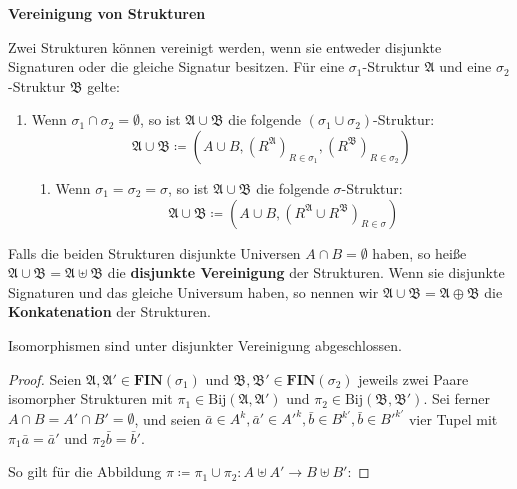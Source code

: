 %
\begin{defn}
\textbf{\label{def:disjoint-union}Vereinigung von Strukturen}

Zwei Strukturen können vereinigt werden, wenn sie entweder disjunkte
Signaturen oder die gleiche Signatur besitzen. Für eine $\sigma_{1}$-Struktur
$\mathfrak{A}$ und eine $\sigma_{2}$-Struktur $\mathfrak{B}$ gelte:

\end{defn}
\begin{enumerate}
\item Wenn $\sigma_{1}\cap\sigma_{2}=\emptyset$, so ist $\mathfrak{A}\cup\mathfrak{B}$
die folgende $\left(\sigma_{1}\cup\sigma_{2}\right)$-Struktur:
\[
\mathfrak{A}\cup\mathfrak{B}\coloneqq\left(A\cup B,\left(R^{\mathfrak{A}}\right)_{R\in\sigma_{1}},\left(R^{\mathfrak{B}}\right)_{R\in\sigma_{2}}\right)
\]

\begin{enumerate}
\item Wenn $\sigma_{1}=\sigma_{2}=\sigma$, so ist $\mathfrak{A}\cup\mathfrak{B}$
die folgende $\sigma$-Struktur:
\[
\mathfrak{A}\cup\mathfrak{B}\coloneqq\left(A\cup B,\left(R^{\mathfrak{A}}\cup R^{\mathfrak{B}}\right)_{R\in\sigma}\right)
\]
\end{enumerate}
\end{enumerate}
\begin{defn}
Falls die beiden Strukturen disjunkte Universen $A\cap B=\emptyset$
haben, so heiße $\mathfrak{A}\cup\mathfrak{B}=\mathfrak{A}\uplus\mathfrak{B}$
die \textbf{disjunkte Vereinigung} der Strukturen. Wenn sie disjunkte
Signaturen und das gleiche Universum haben, so nennen wir $\mathfrak{A}\cup\mathfrak{B}=\mathfrak{A}\oplus\mathfrak{B}$
die \textbf{Konkatenation} der Strukturen.
\end{defn}
\begin{prop}
\label{prop:iso-closed-disjoint}Isomorphismen sind unter disjunkter
Vereinigung abgeschlossen.
\end{prop}
\begin{proof}
Seien $\mathfrak{A},\mathfrak{A}'\in\mathbf{FIN}\left(\sigma_{1}\right)$
und $\mathfrak{B},\mathfrak{B}'\in\mathbf{FIN}\left(\sigma_{2}\right)$
jeweils zwei Paare isomorpher Strukturen mit $\pi_{1}\in\mathrm{Bij}\left(\mathfrak{A},\mathfrak{A}'\right)$
und $\pi_{2}\in\mathrm{Bij}\left(\mathfrak{B},\mathfrak{B}'\right)$.
Sei ferner $A\cap B=A'\cap B'=\emptyset$, und seien $\bar{a}\in A^{k},\bar{a}'\in A'^{k},\bar{b}\in B^{k'},\bar{b}\in B'^{k'}$
vier Tupel mit $\pi_{1}\bar{a}=\bar{a}'$ und $\pi_{2}\bar{b}=\bar{b}'$.

So gilt für die Abbildung $\pi\coloneqq\pi_{1}\cup\pi_{2}:A\uplus A'\rightarrow B\uplus B'$:

\end{proof}
